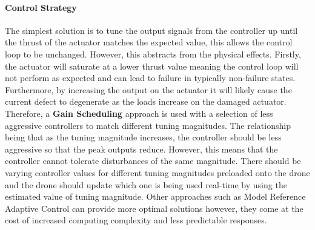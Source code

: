 \paragraph{Control Strategy}
The simplest solution is to tune the output signals from the controller up until the thrust of the actuator matches the expected value, this allows the control loop to be unchanged. However, this abstracts from the physical effects. Firstly, the actuator will saturate at a lower thrust value meaning the control loop will not perform as expected and can lead to failure in typically non-failure states. Furthermore, by increasing the output on the actuator it will likely cause the current defect to degenerate as the loads increase on the damaged actuator. Therefore, a \textbf{Gain Scheduling} approach is used with a selection of less aggressive controllers to match different tuning magnitudes. The relationship being that as the tuning magnitude increases, the controller should be less aggressive so that the peak outputs reduce. However, this means that the controller cannot tolerate disturbances of the same magnitude. There should be varying controller values for different tuning magnitudes preloaded onto the drone and the drone should update which one is being used real-time by using the estimated value of tuning magnitude. Other approaches such as Model Reference Adaptive Control can provide more optimal solutions however, they come at the cost of increased computing complexity and less predictable responses.
